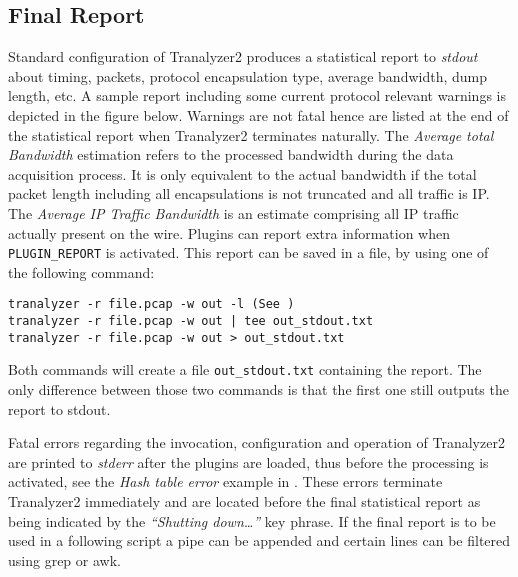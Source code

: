 \subsection{Final Report}
Standard configuration of Tranalyzer2 produces a statistical report to {\em stdout} about timing, packets, protocol encapsulation type, average bandwidth, dump length, etc. A sample report including some current protocol relevant warnings is depicted in the figure below. Warnings are not fatal hence are listed at the end of the statistical report when Tranalyzer2 terminates naturally. The {\em Average total Bandwidth} estimation refers to the processed bandwidth during the data acquisition process. It is only equivalent to the actual bandwidth if the total packet length including all encapsulations is not truncated and all traffic is IP. The {\em Average IP Traffic Bandwidth} is an estimate comprising all IP traffic actually present on the wire. Plugins can report extra information when {\tt PLUGIN\_REPORT} is activated. This report can be saved in a file, by using one of the following command:

\begin{center}
    {\tt tranalyzer -r file.pcap -w out -l (See )}\\
    {\tt tranalyzer -r file.pcap -w out | tee out\_stdout.txt}\\
    {\tt tranalyzer -r file.pcap -w out > out\_stdout.txt}
\end{center}

Both commands will create a file {\tt out\_stdout.txt} containing the report. The only difference between those two commands is that the first one still outputs the report to stdout.

Fatal errors regarding the invocation, configuration and operation of Tranalyzer2 are printed to {\em stderr} after the plugins are loaded, thus before the processing is activated, see the {\em Hash table error} example in . These errors terminate Tranalyzer2 immediately and are located before the final statistical report as being indicated by the {\em ``Shutting down\ldots''} key phrase. If the final report is to be used in a following script a pipe can be appended and certain lines can be filtered using grep or awk.

